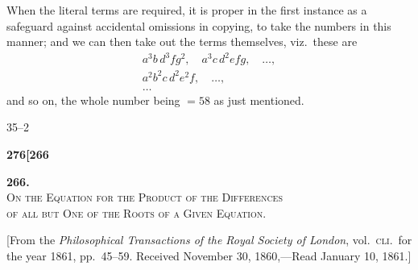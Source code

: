 \documentclass[11pt]{article}
\begin{document}
\medskip

\noindent When the literal terms are required, it is proper in the first instance as a safeguard against accidental omissions in copying, to take the numbers in this manner; and we can then take out the terms themselves, viz.\ these are
\[
\begin{array}{l}
   a^3 b\,d^3 f g^2,\quad a^3 c\,d^2 e f g,\quad \ldots,\\
   a^2 b^2 c\,d^2 e^2 f,\quad \ldots,\\
   \ldots
\end{array}
\]
and so on, the whole number being $= 58$ as just mentioned.

\medskip

\noindent\hfill 35--2

\newpage
\setcounter{page}{276}

\noindent\textbf{276}\hfill\textbf{[266}

\bigskip

\begin{center}
{\large\textbf{266.}}\\[0.6em]
{\large\textsc{On the Equation for the Product of the Differences}}\\
{\large\textsc{of all but One of the Roots of a Given Equation.}}
\end{center}

\medskip

\noindent\small[From the \textit{Philosophical Transactions of the Royal Society of London}, vol.~\textsc{cli.}\ for the year 1861, pp.~45--59. Received November 30, 1860,---Read January 10, 1861.]\normalsize

\medskip
\end{document}
